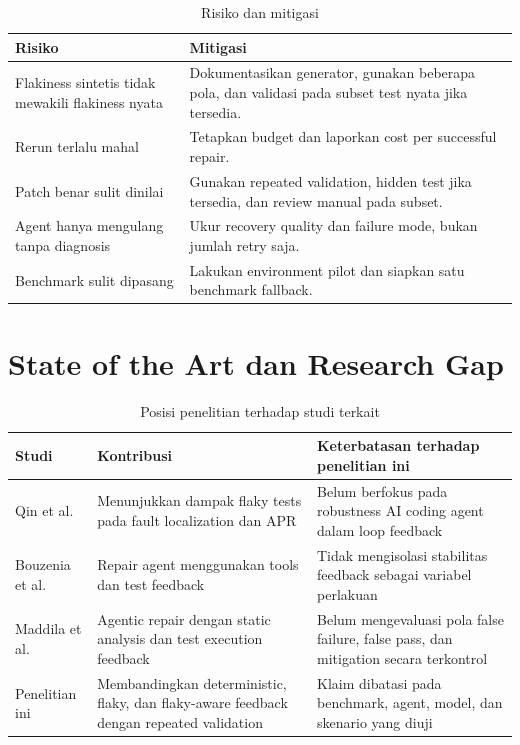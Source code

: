 \begin{table}[htbp]
\centering
\small
\caption{Risiko dan mitigasi}
\label{tab:risks}
\begin{tabularx}{\textwidth}{p{4.0cm}Y}
\toprule
\textbf{Risiko} & \textbf{Mitigasi} \\
\midrule
Flakiness sintetis tidak mewakili flakiness nyata & Dokumentasikan generator, gunakan beberapa pola, dan validasi pada subset test nyata jika tersedia. \\
Rerun terlalu mahal & Tetapkan budget dan laporkan cost per successful repair. \\
Patch benar sulit dinilai & Gunakan repeated validation, hidden test jika tersedia, dan review manual pada subset. \\
Agent hanya mengulang tanpa diagnosis & Ukur recovery quality dan failure mode, bukan jumlah retry saja. \\
Benchmark sulit dipasang & Lakukan environment pilot dan siapkan satu benchmark fallback. \\
\bottomrule
\end{tabularx}
\end{table}

\section{State of the Art dan Research Gap}

\begin{table}[htbp]
\centering
\small
\caption{Posisi penelitian terhadap studi terkait}
\label{tab:gap}
\begin{tabularx}{\textwidth}{p{3.8cm}YY}
\toprule
\textbf{Studi} & \textbf{Kontribusi} & \textbf{Keterbatasan terhadap penelitian ini} \\
\midrule
Qin et al. \cite{qin2021flaky} & Menunjukkan dampak flaky tests pada fault localization dan APR & Belum berfokus pada robustness AI coding agent dalam loop feedback \\
Bouzenia et al. \cite{repairagent2024} & Repair agent menggunakan tools dan test feedback & Tidak mengisolasi stabilitas feedback sebagai variabel perlakuan \\
Maddila et al. \cite{agenticrepair2025} & Agentic repair dengan static analysis dan test execution feedback & Belum mengevaluasi pola false failure, false pass, dan mitigation secara terkontrol \\
Penelitian ini & Membandingkan deterministic, flaky, dan flaky-aware feedback dengan repeated validation & Klaim dibatasi pada benchmark, agent, model, dan skenario yang diuji \\
\bottomrule
\end{tabularx}
\end{table}

